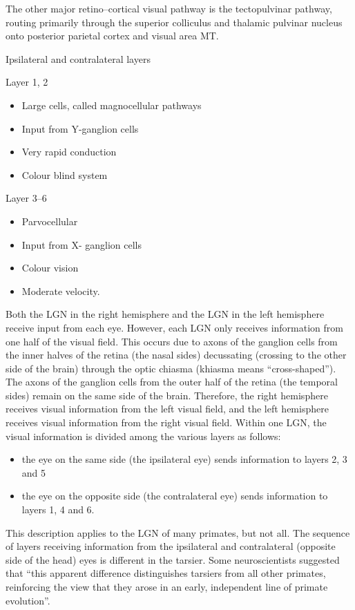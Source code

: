 \documentclass[]{book}
\providecommand{\tightlist}{%
  \setlength{\itemsep}{0pt}\setlength{\parskip}{0pt}}
\begin{document}
The other major retino--cortical visual pathway is the tectopulvinar pathway, routing primarily through the superior colliculus and thalamic pulvinar nucleus onto posterior parietal cortex and visual area MT.

Ipsilateral and contralateral layers

Layer 1, 2

\begin{itemize}
\tightlist
\item
  Large cells, called magnocellular pathways
\item
  Input from Y-ganglion cells
\item
  Very rapid conduction
\item
  Colour blind system
\end{itemize}

Layer 3--6

\begin{itemize}
\tightlist
\item
  Parvocellular
\item
  Input from X- ganglion cells
\item
  Colour vision
\item
  Moderate velocity.
\end{itemize}

Both the LGN in the right hemisphere and the LGN in the left hemisphere receive input from each eye. However, each LGN only receives information from one half of the visual field. This occurs due to axons of the ganglion cells from the inner halves of the retina (the nasal sides) decussating (crossing to the other side of the brain) through the optic chiasma (khiasma means ``cross-shaped''). The axons of the ganglion cells from the outer half of the retina (the temporal sides) remain on the same side of the brain. Therefore, the right hemisphere receives visual information from the left visual field, and the left hemisphere receives visual information from the right visual field. Within one LGN, the visual information is divided among the various layers as follows:

\begin{itemize}
\tightlist
\item
  the eye on the same side (the ipsilateral eye) sends information to layers 2, 3 and 5
\item
  the eye on the opposite side (the contralateral eye) sends information to layers 1, 4 and 6.
\end{itemize}

This description applies to the LGN of many primates, but not all. The sequence of layers receiving information from the ipsilateral and contralateral (opposite side of the head) eyes is different in the tarsier. Some neuroscientists suggested that ``this apparent difference distinguishes tarsiers from all other primates, reinforcing the view that they arose in an early, independent line of primate evolution''.
\end{document}
